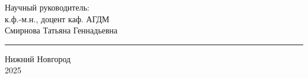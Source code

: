\begin{titlepage}
\begin{center}
\begin{flushright}
    Научный руководитель:\\
    к.ф.-м.н., доцент каф. АГДМ \\
    Смирнова Татьяна Геннадьевна \\
    \hspace{4cm} \rule{4cm}{0.4pt} %
    \end{flushright}
    
    \vfill
    
    \begin{center}
    Нижний Новгород \\
    2025
    \end{center}
    
    \end{center}
    \end{titlepage}
    